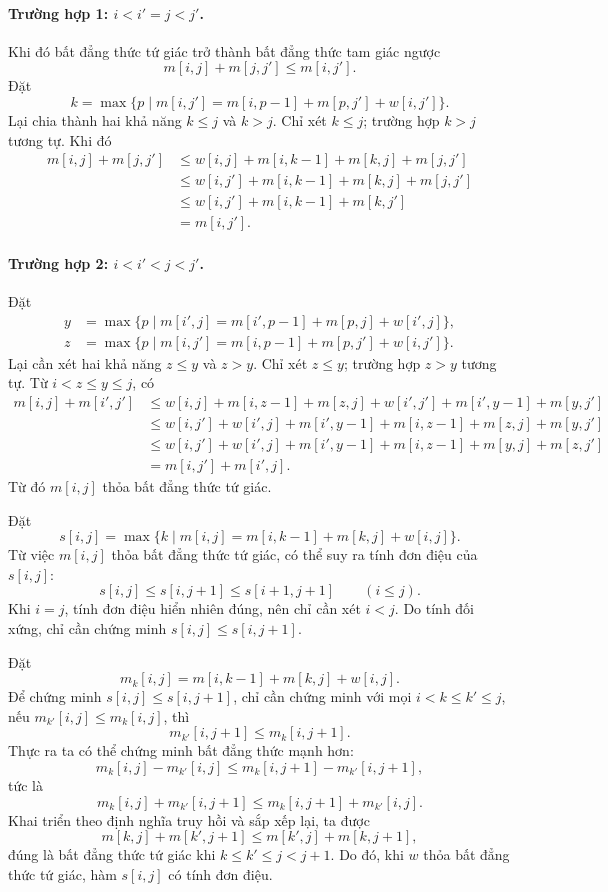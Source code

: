 \documentclass[11pt]{article}
\begin{document}
\paragraph{Trường hợp 1: \(i<i'=j<j'\).}
Khi đó bất đẳng thức tứ giác trở thành bất đẳng thức tam giác ngược
\[
  m[i,j]+m[j,j']\le m[i,j'].
\]
Đặt
\[
  k=\max\{p\mid m[i,j']=m[i,p-1]+m[p,j']+w[i,j']\}.
\]
Lại chia thành hai khả năng \(k\le j\) và \(k>j\). Chỉ xét \(k\le j\); trường
hợp \(k>j\) tương tự. Khi đó
\[
\begin{aligned}
m[i,j]+m[j,j']
&\le w[i,j]+m[i,k-1]+m[k,j]+m[j,j']\\
&\le w[i,j']+m[i,k-1]+m[k,j]+m[j,j']\\
&\le w[i,j']+m[i,k-1]+m[k,j']\\
&=m[i,j'].
\end{aligned}
\]

\paragraph{Trường hợp 2: \(i<i'<j<j'\).}
Đặt
\[
\begin{aligned}
y&=\max\{p\mid m[i',j]=m[i',p-1]+m[p,j]+w[i',j]\},\\
z&=\max\{p\mid m[i,j']=m[i,p-1]+m[p,j']+w[i,j']\}.
\end{aligned}
\]
Lại cần xét hai khả năng \(z\le y\) và \(z>y\). Chỉ xét \(z\le y\); trường
hợp \(z>y\) tương tự. Từ \(i<z\le y\le j\), có
\[
\begin{aligned}
m[i,j]+m[i',j']
&\le w[i,j]+m[i,z-1]+m[z,j]
   +w[i',j']+m[i',y-1]+m[y,j']\\
&\le w[i,j']+w[i',j]+m[i',y-1]+m[i,z-1]+m[z,j]+m[y,j']\\
&\le w[i,j']+w[i',j]+m[i',y-1]+m[i,z-1]+m[y,j]+m[z,j']\\
&=m[i,j']+m[i',j].
\end{aligned}
\]
Từ đó \(m[i,j]\) thỏa bất đẳng thức tứ giác.

Đặt
\[
  s[i,j]=\max\{k\mid m[i,j]=m[i,k-1]+m[k,j]+w[i,j]\}.
\]
Từ việc \(m[i,j]\) thỏa bất đẳng thức tứ giác, có thể suy ra tính đơn điệu
của \(s[i,j]\):
\[
  s[i,j]\le s[i,j+1]\le s[i+1,j+1]\qquad (i\le j).
\]
Khi \(i=j\), tính đơn điệu hiển nhiên đúng, nên chỉ cần xét \(i<j\). Do tính
đối xứng, chỉ cần chứng minh \(s[i,j]\le s[i,j+1]\).

Đặt
\[
  m_k[i,j]=m[i,k-1]+m[k,j]+w[i,j].
\]
Để chứng minh \(s[i,j]\le s[i,j+1]\), chỉ cần chứng minh với mọi
\(i<k\le k'\le j\), nếu \(m_{k'}[i,j]\le m_k[i,j]\), thì
\[
  m_{k'}[i,j+1]\le m_k[i,j+1].
\]
Thực ra ta có thể chứng minh bất đẳng thức mạnh hơn:
\[
  m_k[i,j]-m_{k'}[i,j]\le m_k[i,j+1]-m_{k'}[i,j+1],
\]
tức là
\[
  m_k[i,j]+m_{k'}[i,j+1]\le m_k[i,j+1]+m_{k'}[i,j].
\]
Khai triển theo định nghĩa truy hồi và sắp xếp lại, ta được
\[
  m[k,j]+m[k',j+1]\le m[k',j]+m[k,j+1],
\]
đúng là bất đẳng thức tứ giác khi \(k\le k'\le j<j+1\). Do đó, khi \(w\) thỏa
bất đẳng thức tứ giác, hàm \(s[i,j]\) có tính đơn điệu.
\end{document}
